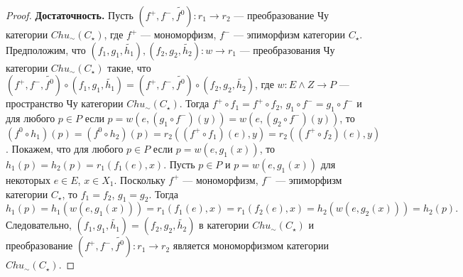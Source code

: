 \documentclass[a4paper,12pt]{article}
\newcommand{\fo}{\widetilde{f^0}}
\begin{document}
\begin{proof}
    \textbf{Достаточность.} Пусть $(f^+,f^-,\fo): r_1 \to r_2$ --- преобразование Чу категории $Chu_\sim(C_\star)$, где $f^+$ --- мономорфизм, $f^-$ --- эпиморфизм категории $C_\star$. Предположим, что $(f_1,g_1,\widetilde{h_1}), (f_2,g_2,\widetilde{h_2}): w \to r_1$ --- преобразования Чу категории $Chu_\sim(C_\star)$ такие, что $(f^+,f^-,\fo) \circ (f_1,g_1,\widetilde{h_1}) = (f^+,f^-,\fo) \circ (f_2,g_2,\widetilde{h_2})$, где $w: E \wedge Z \to P$ --- пространство Чу категории $Chu_\sim(C_\star)$. Тогда $f^+ \circ f_1 = f^+ \circ f_2$, $g_1 \circ f^- = g_1 \circ f^-$ и для любого $p \in P$ если $p = w(e,(g_1 \circ f^-)(y)) = w(e,(g_2 \circ f^-)(y))$, то $(f^0 \circ h_1)(p) = (f^0 \circ h_2)(p) = r_2((f^+ \circ f_1)(e), y) = r_2((f^+ \circ f_2)(e), y)$. Покажем, что для любого $p \in P$ если $p = w(e,g_1(x))$, то $h_1(p) = h_2(p) = r_1(f_1(e),x)$. Пусть $p \in P$ и $p = w(e,g_1(x))$ для некоторых $e \in E$, $x \in X_1$. Поскольку $f^+$ --- мономорфизм, $f^-$ --- эпиморфизм категории $C_\star$, то $f_1 = f_2$, $g_1 = g_2$. Тогда 
    $$
        h_1(p) = h_1(w(e,g_1(x))) = r_1(f_1(e),x) = r_1(f_2(e),x) = h_2(w(e,g_2(x))) = h_2(p).
    $$
    Следовательно, $(f_1,g_1,\widetilde{h_1}) = (f_2,g_2,\widetilde{h_2})$ в категории $Chu_\sim(C_\star)$ и преобразование $(f^+,f^-,\fo): r_1 \to r_2$ является мономорфизмом категории $Chu_\sim(C_\star)$.
\end{proof}
\end{document}
